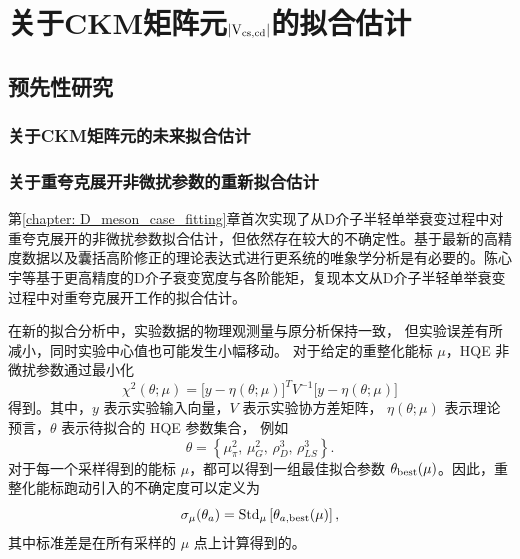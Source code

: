 \chapter{关于CKM矩阵元$|\rm{V_{cs,cd}}|$的拟合估计}
\label{ch:CKMV_fit}
\section{}
\section{}
\section{}
\section{预先性研究}\label{sec:prediction}
\subsection{关于CKM矩阵元的未来拟合估计}
\subsection{关于重夸克展开非微扰参数的重新拟合估计}
第\ref{chapter: D_meson_case_fitting}章首次实现了从D介子半轻单举衰变过程中对重夸克展开的非微扰参数拟合估计，但依然存在较大的不确定性。基于最新的高精度数据以及囊括高阶修正的理论表达式进行更系统的唯象学分析是有必要的。陈心宇等\cite{Author:inprep_XYTao}基于更高精度的D介子衰变宽度与各阶能矩，复现本文从D介子半轻单举衰变过程中对重夸克展开工作的拟合估计。

在新的拟合分析中，实验数据的物理观测量与原分析保持一致，
但实验误差有所减小，同时实验中心值也可能发生小幅移动。
对于给定的重整化能标 \(\mu\)，HQE 非微扰参数通过最小化
\begin{equation}
    \chi^2(\theta;\mu)
    =
    \bigl[y-\eta(\theta;\mu)\bigr]^T
    V^{-1}
    \bigl[y-\eta(\theta;\mu)\bigr]
\end{equation}
得到。其中，\(y\) 表示实验输入向量，\(V\) 表示实验协方差矩阵，
\(\eta(\theta;\mu)\) 表示理论预言，\(\theta\) 表示待拟合的 HQE 参数集合，
例如
\begin{equation}
    \theta =
    \left\{
    \mu_\pi^2,\,
    \mu_G^2,\,
    \rho_D^3,\,
    \rho_{LS}^3
    \right\}.
\end{equation}
对于每一个采样得到的能标 \(\mu\)，都可以得到一组最佳拟合参数
\(\theta_{\rm best}(\mu)\)。因此，重整化能标跑动引入的不确定度可以定义为
\begin{equation}
    \sigma_\mu(\theta_a)
    =
    {\rm Std}_{\mu}
    \left[
    \theta_{a,{\rm best}}(\mu)
    \right],
\end{equation}
其中标准差是在所有采样的 \(\mu\) 点上计算得到的。

